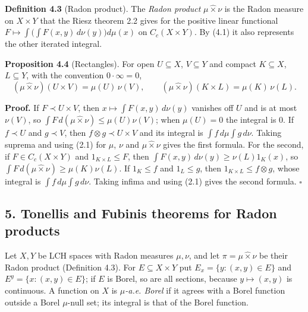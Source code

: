 \documentclass[
  english,
  11pt,
  a4paper,
]{article}
\begin{document}
\textbf{Definition 4.3} (Radon product). The \emph{Radon product}
\(\mu\hat\times\nu\) is the Radon measure on \(X\times Y\) that the
Riesz theorem 2.2 gives for the positive linear functional
\(F\mapsto\int\big(\int F(x,y)\,d\nu(y)\big)d\mu(x)\) on
\(C_c(X\times Y)\). By (4.1) it also represents the other iterated
integral.

\textbf{Proposition 4.4} (Rectangles). For open \(U\subseteq X\),
\(V\subseteq Y\) and compact \(K\subseteq X\), \(L\subseteq Y\), with
the convention \(0\cdot\infty=0\),
\[(\mu\hat\times\nu)(U\times V)=\mu(U)\,\nu(V),\qquad(\mu\hat\times\nu)(K\times L)=\mu(K)\,\nu(L).
\tag{4.2}\]

\textbf{Proof.} If \(F\prec U\times V\), then
\(x\mapsto\int F(x,y)\,d\nu(y)\) vanishes off \(U\) and is at most
\(\nu(V)\), so \(\int F\,d(\mu\hat\times\nu)\leq\mu(U)\nu(V)\); when
\(\mu(U)=0\) the integral is \(0\). If \(f\prec U\) and \(g\prec V\),
then \(f\otimes g\prec U\times V\) and its integral is
\(\int f\,d\mu\int g\,d\nu\). Taking suprema and using (2.1) for
\(\mu\), \(\nu\) and \(\mu\hat\times\nu\) gives the first formula. For
the second, if \(F\in C_c(X\times Y)\) and \(1_{K\times L}\leq F\), then
\(\int F(x,y)\,d\nu(y)\geq\nu(L)1_K(x)\), so
\(\int F\,d(\mu\hat\times\nu)\geq\mu(K)\nu(L)\). If \(1_K\leq f\) and
\(1_L\leq g\), then \(1_{K\times L}\leq f\otimes g\), whose integral is
\(\int f\,d\mu\int g\,d\nu\). Taking infima and using (2.1) gives the
second formula. \(\square\)

\subsection[5. Tonelli\textquotesingle s and Fubini\textquotesingle s
theorems for Radon
products]{\texorpdfstring{\protect\hypertarget{haar-measure-on-locally-compact-groups--oa-fnd-hm-10}{}{}5.
Tonelli\textquotesingle s and Fubini\textquotesingle s theorems for
Radon
products}{5. Tonelli\textquotesingle s and Fubini\textquotesingle s theorems for Radon products}}\label{haar-measure-on-locally-compact-groups--OA-FND-HM-10}

Let \(X,Y\) be LCH spaces with Radon measures \(\mu,\nu\), and let
\(\pi=\mu\hat\times\nu\) be their Radon product (Definition 4.3). For
\(E\subseteq X\times Y\) put \(E_x=\{y:(x,y)\in E\}\) and
\(E^y=\{x:(x,y)\in E\}\); if \(E\) is Borel, so are all sections,
because \(y\mapsto(x,y)\) is continuous. A function on \(X\) is
\emph{\(\mu\)-a.e. Borel} if it agrees with a Borel function outside a
Borel \(\mu\)-null set; its integral is that of the Borel function.
\end{document}
